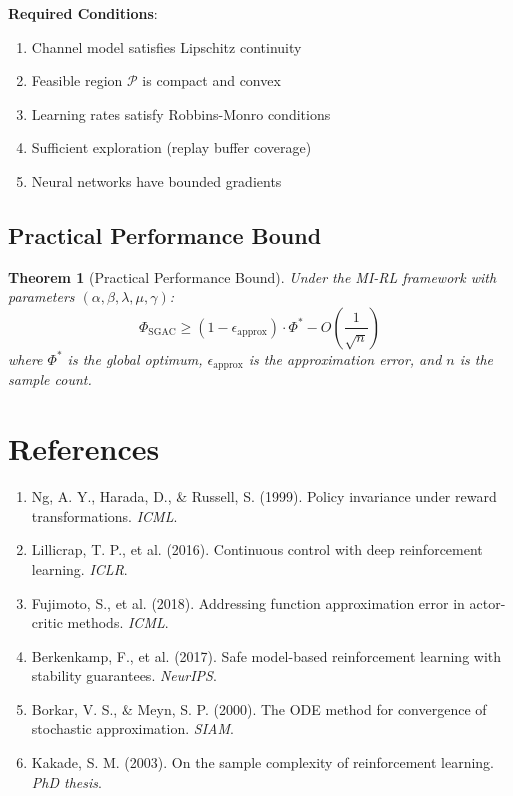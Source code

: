 \documentclass[11pt,a4paper]{article}
\newtheorem{theorem}{Theorem}[section]
\newcommand{\calP}{\mathcal{P}}
\begin{document}
\textbf{Required Conditions}:
\begin{enumerate}
    \item Channel model satisfies Lipschitz continuity
    \item Feasible region $\calP$ is compact and convex
    \item Learning rates satisfy Robbins-Monro conditions
    \item Sufficient exploration (replay buffer coverage)
    \item Neural networks have bounded gradients
\end{enumerate}

\subsection{Practical Performance Bound}

\begin{theorem}[Practical Performance Bound]
Under the MI-RL framework with parameters $(\alpha, \beta, \lambda, \mu, \gamma)$:
\begin{equation}
    \Phi_{\text{SGAC}} \geq (1 - \epsilon_{\text{approx}}) \cdot \Phi^* - O\left(\frac{1}{\sqrt{n}}\right)
\end{equation}
where $\Phi^*$ is the global optimum, $\epsilon_{\text{approx}}$ is the approximation error, and $n$ is the sample count.
\end{theorem}

\section*{References}

\begin{enumerate}
    \item Ng, A. Y., Harada, D., \& Russell, S. (1999). Policy invariance under reward transformations. \textit{ICML}.
    \item Lillicrap, T. P., et al. (2016). Continuous control with deep reinforcement learning. \textit{ICLR}.
    \item Fujimoto, S., et al. (2018). Addressing function approximation error in actor-critic methods. \textit{ICML}.
    \item Berkenkamp, F., et al. (2017). Safe model-based reinforcement learning with stability guarantees. \textit{NeurIPS}.
    \item Borkar, V. S., \& Meyn, S. P. (2000). The ODE method for convergence of stochastic approximation. \textit{SIAM}.
    \item Kakade, S. M. (2003). On the sample complexity of reinforcement learning. \textit{PhD thesis}.
\end{enumerate}
\end{document}

